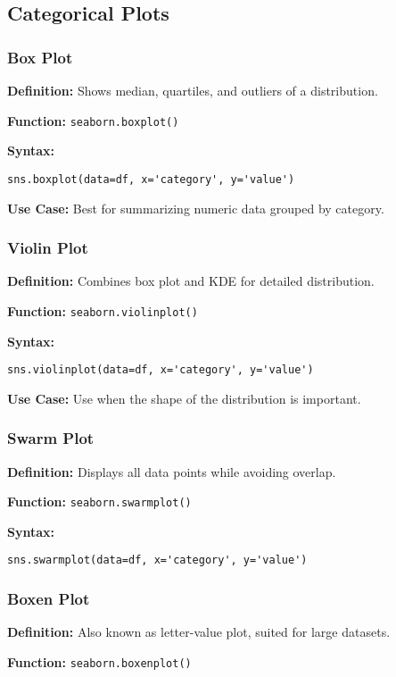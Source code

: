 \subsection{Categorical Plots}

\subsubsection{Box Plot}
\textbf{Definition:} Shows median, quartiles, and outliers of a distribution.

\textbf{Function:} \texttt{seaborn.boxplot()}

\textbf{Syntax:}
\begin{verbatim}
sns.boxplot(data=df, x='category', y='value')
\end{verbatim}

\textbf{Use Case:} Best for summarizing numeric data grouped by category.

\subsubsection{Violin Plot}
\textbf{Definition:} Combines box plot and KDE for detailed distribution.

\textbf{Function:} \texttt{seaborn.violinplot()}

\textbf{Syntax:}
\begin{verbatim}
sns.violinplot(data=df, x='category', y='value')
\end{verbatim}

\textbf{Use Case:} Use when the shape of the distribution is important.

\subsubsection{Swarm Plot}
\textbf{Definition:} Displays all data points while avoiding overlap.

\textbf{Function:} \texttt{seaborn.swarmplot()}

\textbf{Syntax:}
\begin{verbatim}
sns.swarmplot(data=df, x='category', y='value')
\end{verbatim}

\subsubsection{Boxen Plot}
\textbf{Definition:} Also known as letter-value plot, suited for large datasets.

\textbf{Function:} \texttt{seaborn.boxenplot()}

